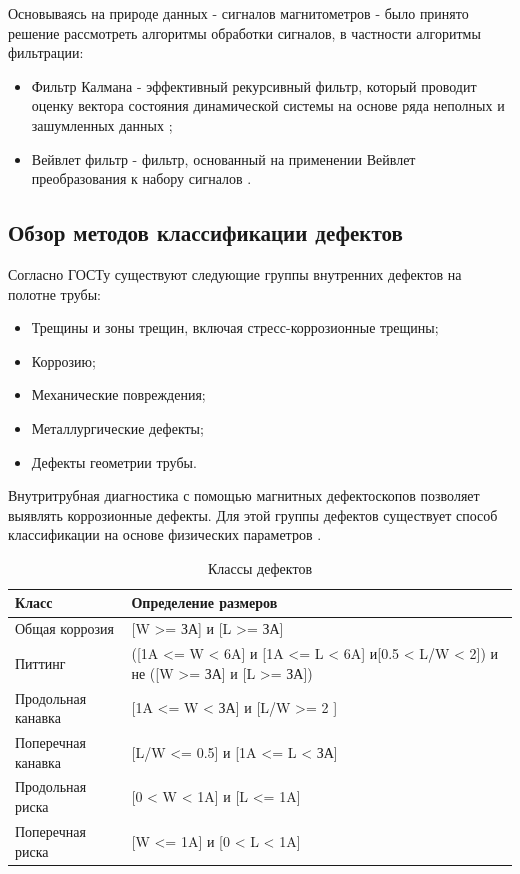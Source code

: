 \documentclass[a4paper,article,14pt]{extarticle}
\begin{document}
Основываясь на природе данных - сигналов магнитометров - было принято решение рассмотреть алгоритмы  обработки сигналов, в частности алгоритмы фильтрации:

\begin{itemize}
    \item Фильтр Калмана - эффективный рекурсивный фильтр, который проводит оценку вектора состояния динамической системы 
    на основе ряда неполных и зашумленных данных \cite{a11};
    \item Вейвлет фильтр - фильтр, основанный на применении Вейвлет преобразования к набору сигналов \cite{a12}.
\end{itemize}

\subsection{Обзор методов классификации дефектов}

Согласно ГОСТу \cite{g1} существуют следующие группы  внутренних дефектов на полотне трубы:

\begin{itemize}
    \item Трещины и зоны трещин, включая стресс-коррозионные трещины;
    \item Коррозию;
    \item Механические повреждения;
    \item Металлургические дефекты;
    \item Дефекты геометрии трубы.
\end{itemize}

Внутритрубная диагностика с помощью магнитных дефектоскопов позволяет выявлять коррозионные дефекты.
Для этой группы дефектов существует способ классификации на основе физических 
параметров \cite{g2}.

\begin{center}
    \begin{longtable}{|p{5cm}|p{7cm}|}
        \caption{Классы дефектов}\\\hline
        Класс & Определение размеров \\ \hline
        Общая коррозия & [W >= ЗА] и [L >= ЗА] \\ \hline
        Питтинг & ([1A <= W < 6A] и [1A <= L < 6A] и[0.5 < L/W < 2]) и не ([W >= ЗА] и [L >= ЗА]) \\ \hline
        Продольная канавка & [1A <= W < ЗА] и [L/W >= 2 ] \\ \hline
        Поперечная канавка & [L/W <= 0.5] и [1A <= L < ЗА] \\ \hline
        Продольная риска & [0 < W < 1A] и [L <= 1A] \\ \hline
        Поперечная риска & [W <= 1A] и [0 < L < 1A] \\ \hline
    \end{longtable}
\end{center}
\end{document}
